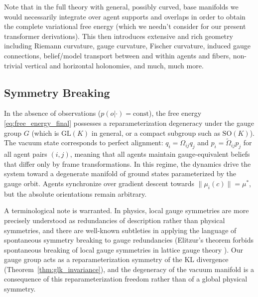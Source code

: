 \documentclass[twoside,11pt]{article}
\begin{document}
Note that in the full theory with general, possibly curved, base manifolds we would necessarily integrate over agent supports and overlaps in order to obtain the complete variational free energy (which we needn't consider for our present transformer derivations). This then introduces extensive and rich geometry including Riemann curvature, gauge curvature, Fischer curvature, induced gauge connections, belief/model transport between and within agents and fibers, non-trivial vertical and horizontal holonomies, and much, much more.

\subsection{Symmetry Breaking}
\label{sec:symmetry_breaking}
In the absence of observations ($p(o|\cdot) = \text{const}$), the free energy \eqref{eq:free_energy_final} possesses a reparameterization degeneracy under the gauge group $G$ (which is $\mathrm{GL}(K)$ in general, or a compact subgroup such as $\mathrm{SO}(K)$). The vacuum state corresponds to perfect alignment: $q_i = \Omega_{ij}q_j$ and $p_i = \tilde{\Omega}_{ij}p_j$ for all agent pairs $(i,j)$, meaning that all agents maintain gauge-equivalent beliefs that differ only by frame transformations. In this regime, the dynamics drive the system toward a degenerate manifold of ground states parameterized by the gauge orbit. Agents synchronize over gradient descent towards $\|\mu_i(c)\| = \mu^*$, but the absolute orientations remain arbitrary.

A terminological note is warranted. In physics, local gauge symmetries are more precisely understood as redundancies of description rather than physical symmetries, and there are well-known subtleties in applying the language of spontaneous symmetry breaking to gauge redundancies (Elitzur's theorem forbids spontaneous breaking of local gauge symmetries in lattice gauge theory \citep{weinberg1995quantum}). Our gauge group acts as a reparameterization symmetry of the KL divergence (Theorem~\ref{thm:glk_invariance}), and the degeneracy of the vacuum manifold is a consequence of this reparameterization freedom rather than of a global physical symmetry.
\end{document}
